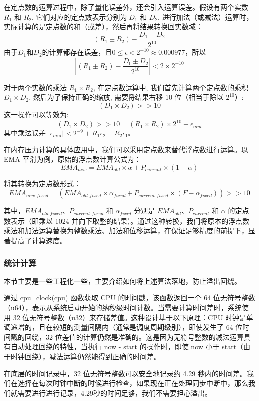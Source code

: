 在定点数的运算过程中，除了量化误差外，还会引入运算误差。假设有两个实数 \(R_1\) 和 \(R_2\), 它们对应的定点数表示分别为 \(D_1\) 和 \(D_2\). 进行加法（或减法）运算时，实际计算的是定点数的和（或差），然后再将结果转换回实数域：
\[
(R_1 \pm R_2) - \frac{D_1 \pm D_2}{2^{10}}
\]
由于\(D_1\)和\(D_2\)的计算都存在误差，且\(0 \leq \epsilon < 2^{-10} \approx 0.000977\)，所以
\[
|(R_1 \pm R_2) - \frac{D_1 \pm D_2}{2^{10}}| < 2 \times 2^{-10}
\]

对于两个实数的乘法 \(R_1 \times R_2\), 在定点数运算中, 我们首先计算两个定点数的乘积 \(D_1 \times D_2\), 然后为了保持正确的缩放, 需要将结果右移 10 位（相当于除以 \(2^{10}\)）:
\[
(D_1 \times D_2) >> 10
\]
这一操作可以等效为:
\[
(D_1 \times D_2) >> 10 = (R_1 \times R_2) \times 2^{10} + \epsilon_{mul}
\]
其中乘法误差 \(|\epsilon_{mul}| < 2^{-9} + R_1\epsilon_2 + R_2\epsilon_1\)。

在内存压力计算的具体应用中，我们可以采用定点数来替代浮点数进行运算。以 EMA 平滑为例，原始的浮点数计算公式为：
\[
EMA_{new} = EMA_{old} \times \alpha + P_{current} \times (1 - \alpha)
\]

将其转换为定点数形式：
\[
EMA_{new\_fixed} = (EMA_{old\_fixed} \times \alpha_{fixed} + P_{current\_fixed} \times (F - \alpha_{fixed})) >> 10
\]

其中，\(EMA_{old\_fixed}\)、\(P_{current\_fixed}\) 和 \(\alpha_{fixed}\) 分别是 \(EMA_{old}\)、\(P_{current}\) 和 \(\alpha\) 的定点数表示（即乘以 1024 并向下取整的结果）。通过这种转换，我们将原本的浮点数乘法和加法运算替换为整数乘法、加法和位移运算，在保证足够精度的前提下，显著提高了计算速度。

\subsubsection{统计计算}

本节主要是一些工程化一些，主要介绍如何将上述算法落地，防止溢出回绕。

通过 cpu\_clock(cpu) 函数获取 CPU 的时间戳，该函数返回一个 64 位无符号整数（u64），表示从系统启动开始的纳秒级时间计数。当需要计算时间差时，系统使用 32 位无符号整数（u32）来存储差值。这种设计基于以下原理：CPU 时钟是单调递增的，且在较短的测量间隔内（通常是调度周期级别），即使发生了 64 位时间戳的回绕，32 位差值的计算仍然是准确的。这是因为无符号整数的减法运算具有自动处理回绕的特性，当执行 now - start 的操作时，即使 now 小于 start（由于时钟回绕），减法运算仍然能得到正确的时间差。

在底层的时间记录中，32 位无符号整数可以安全地记录约 4.29 秒内的时间差。我们在选择在每次时钟中断的时候进行检查，如果现在正在处理同步中断中，那么我们就需要进行进行记录，4.29秒的时间足够，我们不需要担心溢出。

